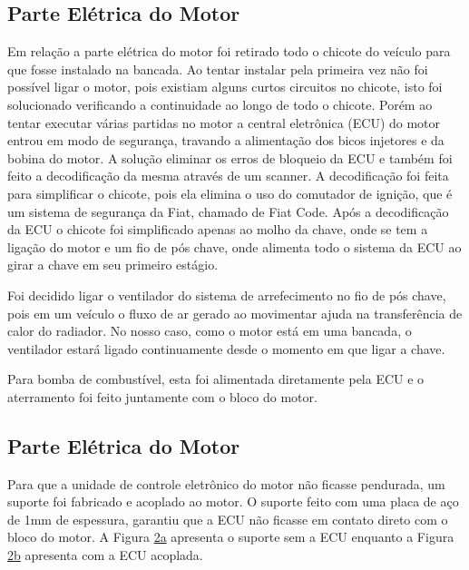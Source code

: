 \subsection{Parte Elétrica do Motor}

Em relação a parte elétrica do motor foi retirado todo o chicote do veículo para que fosse instalado na bancada. Ao tentar instalar pela primeira vez não foi possível ligar o motor, pois existiam alguns curtos circuitos no chicote, isto foi solucionado verificando a continuidade ao longo de todo o chicote. Porém ao tentar executar várias partidas no motor a central eletrônica (ECU) do motor entrou em modo de segurança, travando a alimentação dos bicos injetores e da bobina do motor. A solução eliminar os erros de bloqueio da ECU e também foi feito a decodificação da mesma através de um scanner. A decodificação foi feita para simplificar o chicote, pois ela elimina o uso do comutador de ignição, que é um sistema de segurança da Fiat, chamado de Fiat Code. Após a decodificação da ECU o chicote foi simplificado apenas ao molho da chave, onde se tem a ligação do motor e um fio de pós chave, onde alimenta todo o sistema da ECU ao girar a chave em seu primeiro estágio.

Foi decidido ligar o ventilador do sistema de arrefecimento no fio de pós chave, pois em um veículo o fluxo de ar gerado ao movimentar ajuda na transferência de calor do radiador. No nosso caso, como o motor está em uma bancada, o ventilador estará ligado continuamente desde o momento em que ligar a chave. 

Para bomba de combustível, esta foi alimentada diretamente pela ECU e o aterramento foi feito juntamente com o bloco do motor. 


\subsection{Parte Elétrica do Motor}

Para que a unidade de controle eletrônico do motor não ficasse pendurada, um suporte foi fabricado e acoplado ao motor. O suporte feito com uma placa de aço de 1mm de espessura, garantiu que a ECU não ficasse em contato direto com o bloco do motor. A Figura \hyperref[fig:ecu]{2a} apresenta o suporte sem a ECU enquanto a Figura \hyperref[fig:ecu]{2b} apresenta com a ECU acoplada.

